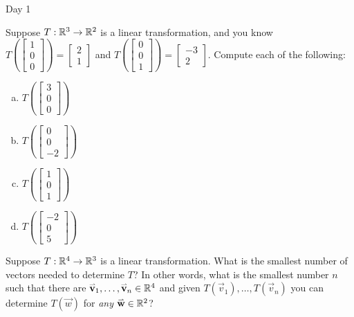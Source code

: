 \begin{applicationActivities}{Day 1}
\begin{activity}
Suppose $T: \mathbb{R}^3 \rightarrow \mathbb{R}^2$ is a linear transformation, and you know $T\left(\begin{bmatrix} 1 \\ 0 \\ 0 \end{bmatrix} \right) = \begin{bmatrix} 2 \\ 1 \end{bmatrix} $ and $T\left(\begin{bmatrix} 0 \\ 0 \\ 1 \end{bmatrix} \right) = \begin{bmatrix} -3 \\ 2 \end{bmatrix} $.  Compute each of the following:
\begin{enumerate}[(a)]
\item $T\left(\begin{bmatrix} 3 \\ 0 \\ 0 \end{bmatrix}\right)$
\item $T\left(\begin{bmatrix} 0 \\ 0 \\ -2 \end{bmatrix}\right)$
\item $T\left(\begin{bmatrix} 1 \\ 0 \\ 1 \end{bmatrix}\right)$
\item $T\left(\begin{bmatrix} -2 \\ 0 \\ 5 \end{bmatrix}\right)$
\end{enumerate}
\end{activity}

\begin{activity}
Suppose $T: \mathbb{R}^4 \rightarrow \mathbb{R}^3$ is a linear transformation.  What is the smallest number of vectors needed to determine $T$?  In other words, what is the smallest number $n$ such that there are $\mathbf{\accentset{\rightharpoonup}{v}}_1,\ldots,\mathbf{\accentset{\rightharpoonup}{v}}_n \in \mathbb{R}^4$ and given  $T(\vec{v}_1), \ldots, T(\vec{v}_n)$ you can determine $T(\vec{w})$ for \textit{any} $\mathbf{\accentset{\rightharpoonup}{w}} \in \mathbb{R}^2$?
\end{activity}


\end{applicationActivities}
